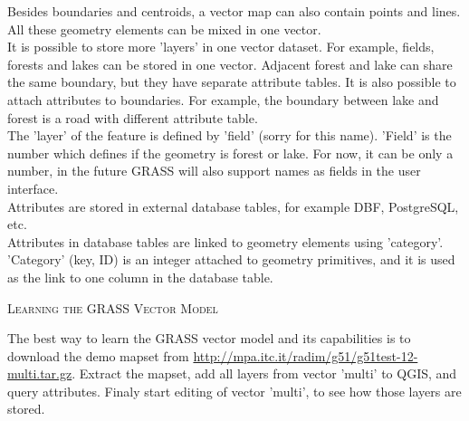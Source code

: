 \documentclass[10pt,english]{article}
\newcommand\qgistip[1]{\raggedright\small{#1}}
\begin{document}
\begin{onehalfspace}
Besides boundaries and centroids, a vector map can also contain
points and lines. All these geometry elements can be mixed
in one vector.\\

It is possible to store more 'layers' in one vector dataset. For example,
fields, forests and lakes can be stored in one vector. Adjacent
forest and lake can share the same boundary, but they have separate attribute tables.
It is also possible to attach attributes to boundaries. For example, the boundary between lake and forest is a road with different attribute table.\\

The 'layer' of the feature is defined by 'field' (sorry for this name).
'Field' is the number which defines if the geometry is forest or lake.
For now, it can be only a number, in the future GRASS will also support  
names as fields in the user interface.\\

Attributes are stored in external database tables, for example
DBF, PostgreSQL, etc.\\

Attributes in database tables are linked to geometry elements
using 'category'. 'Category' (key, ID) is an integer attached to
geometry primitives, and it is used as the link to one column in the database table.\\
\begin{Tip}\caption{\textsc{Learning the GRASS Vector Model}}
\qgistip{The best way to learn the GRASS vector model and its capabilities
is to download the demo mapset from \url{http://mpa.itc.it/radim/g51/g51test-12-multi.tar.gz}.
Extract the mapset, add all layers from vector 'multi' to QGIS, and query attributes.
Finaly start editing of vector 'multi', to see how those layers are stored.
}
\end{Tip} 

\end{onehalfspace}
\end{document}
